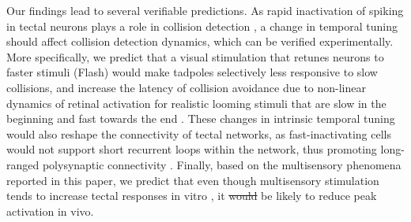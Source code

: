 \documentclass{article}
\providecommand{\DIFaddtex}[1]{{\protect\color{blue}\uwave{#1}}} %
\providecommand{\DIFdeltex}[1]{{\protect\color{red}\sout{#1}}}                      %
\providecommand{\DIFaddbegin}{} %
\providecommand{\DIFaddend}{} %
\providecommand{\DIFdelbegin}{} %
\providecommand{\DIFdelend}{} %
\providecommand{\DIFadd}[1]{\texorpdfstring{\DIFaddtex{#1}}{#1}} %
\providecommand{\DIFdel}[1]{\texorpdfstring{\DIFdeltex{#1}}{}} %
\newcommand{\DIFscaledelfig}{0.5}
\newlength{\DIFdelgraphicswidth} %
\newlength{\DIFdelgraphicsheight} %
\newcommand{\DIFaddincludegraphics}[2][]{{\color{blue}\fbox{\DIFOincludegraphics[#1]{#2}}}} %
\newcommand{\DIFdelincludegraphics}[2][]{%
\sbox{\DIFdelgraphicsbox}{\DIFOincludegraphics[#1]{#2}}%
\settoboxwidth{\DIFdelgraphicswidth}{\DIFdelgraphicsbox} %
\settoboxtotalheight{\DIFdelgraphicsheight}{\DIFdelgraphicsbox} %
\scalebox{\DIFscaledelfig}{%
\parbox[b]{\DIFdelgraphicswidth}{\usebox{\DIFdelgraphicsbox}\\[-\baselineskip] \rule{\DIFdelgraphicswidth}{0em}}\llap{\resizebox{\DIFdelgraphicswidth}{\DIFdelgraphicsheight}{%
\setlength{\unitlength}{\DIFdelgraphicswidth}%
\begin{picture}(1,1)%
\thicklines\linethickness{2pt} %
{\color[rgb]{1,0,0}\put(0,0){\framebox(1,1){}}}%
{\color[rgb]{1,0,0}\put(0,0){\line( 1,1){1}}}%
{\color[rgb]{1,0,0}\put(0,1){\line(1,-1){1}}}%
\end{picture}%
}\hspace*{3pt}}} %
} %
\DeclareRobustCommand{\DIFaddbegin}{\DIFOaddbegin \let\includegraphics\DIFaddincludegraphics} %
\DeclareRobustCommand{\DIFaddend}{\DIFOaddend \let\includegraphics\DIFOincludegraphics} %
\DeclareRobustCommand{\DIFdelbegin}{\DIFOdelbegin \let\includegraphics\DIFdelincludegraphics} %
\DeclareRobustCommand{\DIFdelend}{\DIFOaddend \let\includegraphics\DIFOincludegraphics} %
\begin{document}
Our findings lead to several verifiable predictions. As rapid inactivation of spiking in tectal neurons plays a role in collision detection \citep{khakhalin2014,jang2016}, a change in temporal tuning should affect collision detection dynamics, which can be verified experimentally. More specifically, we predict that a visual stimulation that retunes neurons to faster stimuli (Flash) would make tadpoles selectively less responsive to slow collisions, and increase the latency of collision avoidance due to non-linear dynamics of retinal activation for realistic looming stimuli that are slow in the beginning and fast towards the end \citep{jang2016}. These changes in intrinsic temporal tuning would also reshape the connectivity of tectal networks, as fast-inactivating cells would not support short recurrent loops within the network, thus promoting long-ranged polysynaptic connectivity \citep{fiete2010stdp,clopath2010stdp}. Finally, based on the multisensory phenomena reported in this paper, we predict that even though multisensory stimulation tends to increase tectal responses in vitro \citep{felch2016,truszkowski2017}, it \DIFdelbegin \DIFdel{would }\DIFdelend \DIFaddbegin \DIFadd{is }\DIFaddend be likely to reduce peak activation in vivo. 

\end{document}
